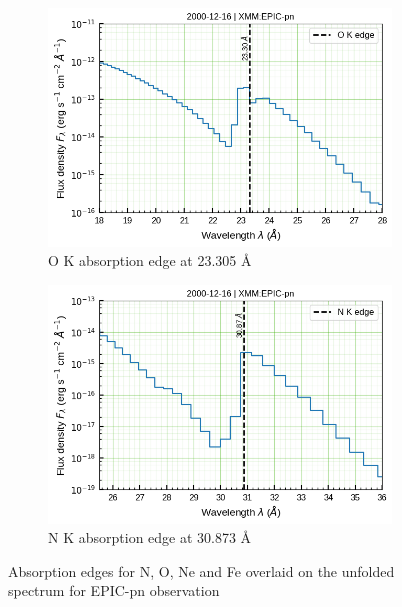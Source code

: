\begin{figure}[!bht]
\begin{subfigure}[b]{0.45\textwidth}
            \includegraphics[width=\textwidth]{figures/eufspec/mr-vel-XMM-EPIC-pn-uf-O-edges.png}
            \caption{O K absorption edge at 23.305 \AA}
            \label{fig:pn-uf:O-edges}
        \end{subfigure}
        \hfill
        \begin{subfigure}[b]{0.45\textwidth}
            \includegraphics[width=\textwidth]{figures/eufspec/mr-vel-XMM-EPIC-pn-uf-N-edges.png}
            \caption{N K absorption edge at 30.873 \AA}
            \label{fig:pn-uf:N-edges}
        \end{subfigure}
        \caption{Absorption edges for N, O, Ne and Fe overlaid on the unfolded spectrum for EPIC-pn observation}
        \label{fig:pn-uf:abs-edges}
    \end{figure}
